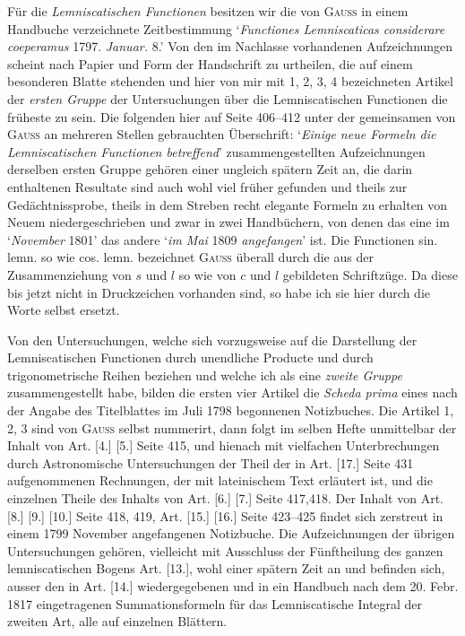 \medskip
Für die \textit{Lemniscatischen Functionen} besitzen wir die von \textsc{Gauss} in einem Handbuche verzeichnete Zeitbestimmung `\textit{Functiones Lemniscaticas considerare coeperamus} 1797. \textit{Januar.} 8.' Von den im Nachlasse vorhandenen Aufzeichnungen scheint nach Papier und Form der Handschrift zu urtheilen, die auf einem besonderen Blatte stehenden und hier von mir mit 1, 2, 3, 4 bezeichneten Artikel der \textit{ersten Gruppe} der Untersuchungen über die Lemniscatischen Functionen die früheste zu sein. Die folgenden hier auf Seite 406--412 unter der gemeinsamen von \textsc{Gauss} an mehreren Stellen gebrauchten Überschrift: `\textit{Einige neue Formeln die Lemniscatischen Functionen betreffend}' zusammengestellten Aufzeichnungen derselben ersten Gruppe gehören einer ungleich spätern Zeit an, die darin enthaltenen Resultate sind auch wohl viel früher gefunden und theils zur Gedächtnissprobe, theils in dem Streben recht elegante Formeln zu erhalten von Neuem niedergeschrieben und zwar in zwei Handbüchern, von denen das eine im `\textit{November} 1801' das andere `\textit{im Mai} 1809 \textit{angefangen}' ist. Die Functionen sin. lemn. so wie cos. lemn. bezeichnet \textsc{Gauss} überall durch die aus der Zusammenziehung von \(s\) und \(l\) so wie von \(c\) und \(l\) gebildeten Schriftzüge. Da diese bis jetzt nicht in Druckzeichen vorhanden sind, so habe ich sie hier durch die Worte selbst ersetzt.


Von den Untersuchungen, welche sich vorzugsweise auf die Darstellung der Lemniscatischen Functionen durch unendliche Producte und durch trigonometrische Reihen beziehen und welche ich als eine \textit{zweite Gruppe} zusammengestellt habe, bilden die ersten vier Artikel die \textit{Scheda prima} eines nach der Angabe des Titelblattes im Juli 1798 begonnenen Notizbuches. Die Artikel 1, 2, 3 sind von \textsc{Gauss} selbst nummerirt, dann folgt im selben Hefte unmittelbar der Inhalt von Art. [4.] [5.] Seite 415, und hienach mit vielfachen Unterbrechungen durch Astronomische Untersuchungen der Theil der in Art. [17.] Seite 431 aufgenommenen Rechnungen, der mit lateinischem Text erläutert ist, und die einzelnen Theile des Inhalts von Art. [6.] [7.] Seite 417,418. Der Inhalt von Art. [8.] [9.] [10.] Seite 418, 419, Art. [15.] [16.] Seite 423--425 findet sich zerstreut in einem 1799 November angefangenen Notizbuche. Die Aufzeichnungen der übrigen Untersuchungen gehören, vielleicht mit Ausschluss der Fünftheilung des ganzen lemniscatischen Bogens Art. [13.], wohl einer spätern Zeit an und befinden sich, ausser den in Art. [14.] wiedergegebenen und in ein Handbuch nach dem 20. Febr. 1817 eingetragenen Summationsformeln für das Lemniscatische Integral der zweiten Art, alle auf einzelnen Blättern.

